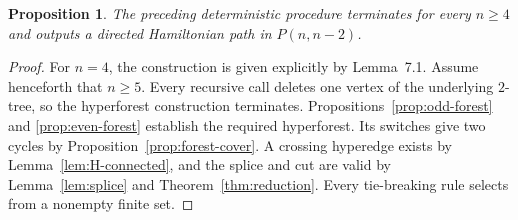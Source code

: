 \documentclass[4pt]{article} %
\newtheorem{proposition}[theorem]{Proposition}
\begin{document}
\begin{proposition}\label{prop:algorithm}
The preceding deterministic procedure terminates for every $n\geq4$ and
outputs a directed Hamiltonian path in $P(n,n-2)$.
\end{proposition}

\begin{proof}
For \(n=4\), the construction is given explicitly by Lemma~7.1.
Assume henceforth that \(n\ge5\). 
Every recursive call deletes one vertex of the underlying $2$-tree, so the
hyperforest construction terminates. Propositions~\ref{prop:odd-forest} and
\ref{prop:even-forest} establish the required hyperforest. Its switches give
two cycles by Proposition~\ref{prop:forest-cover}. A crossing hyperedge
exists by Lemma~\ref{lem:H-connected}, and the splice and cut are valid by
Lemma~\ref{lem:splice} and Theorem~\ref{thm:reduction}. Every tie-breaking
rule selects from a nonempty finite set.
\end{proof}
\end{document}
